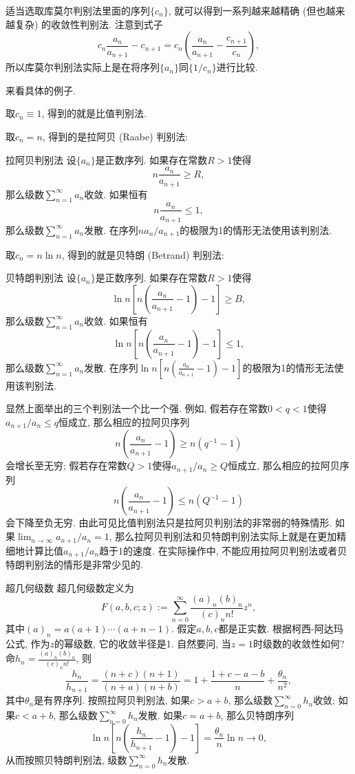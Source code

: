 适当选取库莫尔判别法里面的序列$\{c_n\}$, 就可以得到一系列越来越精确 (但也越来越复杂) 的收敛性判别法. 注意到式子
$$
c_n\frac{a_n}{a_{n+1}}-c_{n+1}=c_n\left(\frac{a_n}{a_{n+1}}-\frac{c_{n+1}}{c_n}\right),
$$
所以库莫尔判别法实际上是在将序列$\{a_n\}$同$\{1/c_n\}$进行比较.

来看具体的例子. 

取$c_n\equiv1$, 得到的就是比值判别法.

取$c_n=n$, 得到的是拉阿贝 (Raabe) 判别法:

\begin{theorem}{拉阿贝判别法}
设$\{a_n\}$是正数序列. 如果存在常数$R>1$使得
$$
n\frac{a_n}{a_{n+1}}\geq R,
$$
那么级数$\sum_{n=1}^\infty a_n$收敛. 如果恒有
$$
n\frac{a_n}{a_{n+1}}\leq 1,
$$
那么级数$\sum_{n=1}^\infty a_n$发散. 在序列$na_n/a_{n+1}$的极限为1的情形无法使用该判别法.
\end{theorem}

取$c_n=n\ln n$, 得到的就是贝特朗 (Betrand) 判别法:
\begin{theorem}{贝特朗判别法}
设$\{a_n\}$是正数序列. 如果存在常数$R>1$使得
$$
\ln n \left[n\left(\frac{a_n}{a_{n+1}}-1\right)-1\right]\geq B,
$$
那么级数$\sum_{n=1}^\infty a_n$收敛. 如果恒有
$$
\ln n \left[n\left(\frac{a_n}{a_{n+1}}-1\right)-1\right]\leq1,
$$
那么级数$\sum_{n=1}^\infty a_n$发散. 在序列$\ln n \left[n\left(\frac{a_n}{a_{n+1}}-1\right)-1\right]$的极限为1的情形无法使用该判别法.
\end{theorem}

显然上面举出的三个判别法一个比一个强. 例如, 假若存在常数$0<q<1$使得$a_{n+1}/a_{n}\leq q$恒成立, 那么相应的拉阿贝序列
$$
n\left(\frac{a_n}{a_{n+1}}-1\right)\geq n(q^{-1}-1)
$$
会增长至无穷; 假若存在常数$Q>1$使得$a_{n+1}/a_{n}\geq Q$恒成立, 那么相应的拉阿贝序列
$$
n\left(\frac{a_n}{a_{n+1}}-1\right)\leq n(Q^{-1}-1)
$$
会下降至负无穷. 由此可见比值判别法只是拉阿贝判别法的非常弱的特殊情形. 如果$\lim_{n\to\infty}a_{n+1}/a_{n}=1$, 那么拉阿贝判别法和贝特朗判别法实际上就是在更加精细地计算比值$a_{n+1}/a_{n}$趋于1的速度. 在实际操作中, 不能应用拉阿贝判别法或者贝特朗判别法的情形是非常少见的.

\begin{example}{超几何级数}
超几何级数定义为
$$
F(a,b,c;z):=\sum_{n=0}^\infty\frac{(a)_n(b)_n}{(c)_nn!}z^{n},
$$
其中$(a)_n=a(a+1)\dotsm(a+n-1)$. 假定$a,b,c$都是正实数. 根据柯西-阿达玛公式, 作为$z$的幂级数, 它的收敛半径是1. 自然要问, 当$z=1$时级数的收敛性如何? 
命$h_n=\frac{(a)_n(b)_n}{(c)_nn!}$, 则
$$
\frac{h_n}{h_{n+1}}=\frac{(n+c)(n+1)}{(n+a)(n+b)}
=1+\frac{1+c-a-b}{n}+\frac{\theta_n}{n^2},
$$
其中$\theta_n$是有界序列. 按照拉阿贝判别法, 如果$c>a+b$, 那么级数$\sum_{n=0}^\infty h_n$收敛; 如果$c<a+b$, 那么级数$\sum_{n=0}^\infty h_n$发散. 如果$c=a+b$, 那么贝特朗序列
$$
\ln n \left[n\left(\frac{h_n}{h_{n+1}}-1\right)-1\right]
=\frac{\theta_n}{n}\ln n\to0,
$$
从而按照贝特朗判别法, 级数$\sum_{n=0}^\infty h_n$发散.
\end{example}